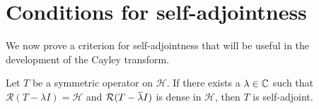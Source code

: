 \documentclass[article, a4paper, 11pt, oneside]{memoir}
\makeatletter
\numberwithin{equation}{chapter}
\newcommand{\calH}{\mathcal{H}}
\newcommand{\calK}{\mathcal{K}}
\newcommand{\dom}{\mathcal{D}}
\newcommand{\range}{\mathcal{R}}
\theoremstyle{myexample}
\theoremstyle{myexample}
\theoremstyle{myexamplebreak}
\theoremstyle{myexamplebreak}
\theoremstyle{nonumberplain}
\newtheorem{proof}{\protect\@proof}
\theoremstyle{MyNonumberplain}
\newcommand{\@proof}{}
\renewcommand{\@proof}{Proof}%
\renewcommand{\@proof}{Bevis}%
\makeatother
\begin{document}


    

    


\section{Conditions for self-adjointness}

We now prove a criterion for self-adjointness that will be useful in the development of the Cayley transform.

\begin{proposition}
    \label{thm:selfadjoint_criterion}
    Let $T$ be a symmetric operator on $\calH$. If there exists a $\lambda \in \mathbb{C}$ such that $\range(T - \lambda I) = \calH$ and $\range(T - \conj{\lambda} I)$ is dense in $\calH$, then $T$ is self-adjoint.
\end{proposition}
\end{document}
